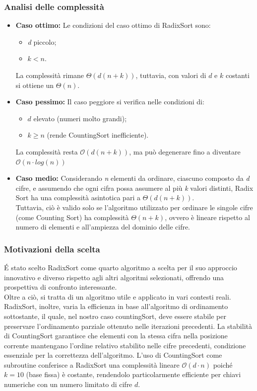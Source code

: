 \documentclass[a4paper, 11pt]{article}
\begin{document}
\subsubsection{Analisi delle complessità}
\begin{itemize}
    \item \textbf{Caso ottimo: }Le condizioni del caso ottimo di RadixSort sono:
    \begin{itemize}
        \item \textit{d} piccolo;
        \item $k < n$.
    \end{itemize}
    La complessità rimane $\Theta(d(n + k))$, tuttavia, con valori di $d$ e $k$ costanti si ottiene un $\Theta(n)$.
    \item \textbf{Caso pessimo: }Il caso peggiore si verifica nelle condizioni di:
    \begin{itemize}
        \item $d$ elevato (numeri molto grandi);
        \item $k \geq n$ (rende CountingSort inefficiente).
    \end{itemize}
    La complessità resta $\mathcal{O}(d(n + k))$, ma può degenerare fino a diventare $\mathcal{O}(n\cdot log(n))$
    \item \textbf{Caso medio: }Considerando \textit{n} elementi da ordinare, ciascuno composto da \textit{d} cifre, e assumendo che ogni cifra possa assumere al più \textit{k} valori distinti, Radix Sort ha una complessità asintotica pari a $\Theta(d(n + k))$.\\
    Tuttavia, ciò è valido solo se l'algoritmo utilizzato per ordinare le singole cifre (come Counting Sort) ha complessità $\Theta(n + k)$, ovvero è lineare rispetto al numero di elementi e all'ampiezza del dominio delle cifre.
\end{itemize}

\subsubsection{Motivazioni della scelta}
É stato scelto RadixSort come quarto algoritmo a scelta per il suo approccio innovativo e diverso rispetto agli altri algoritmi selezionati, offrendo una prospettiva di confronto interessante.\\
Oltre a ciò, si tratta di un algoritmo utile e applicato in vari contesti reali.\bigbreak
\noindent RadixSort, inoltre, varia la efficienza in base all'algoritmo di ordinamento sottostante, il quale, nel nostro caso countingSort, deve essere stabile per preservare l'ordinamento parziale ottenuto nelle iterazioni precedenti. La stabilità di CountingSort garantisce che elementi con la stessa cifra nella posizione corrente mantengano l'ordine relativo stabilito nelle cifre precedenti, condizione essenziale per la correttezza dell'algoritmo. L'uso di CountingSort come subroutine conferisce a RadixSort una complessità lineare $\mathcal{O}(d \cdot n)$ poiché $k = 10$ (base fissa) è costante, rendendolo particolarmente efficiente per chiavi numeriche con un numero limitato di cifre $d$.
\end{document}
